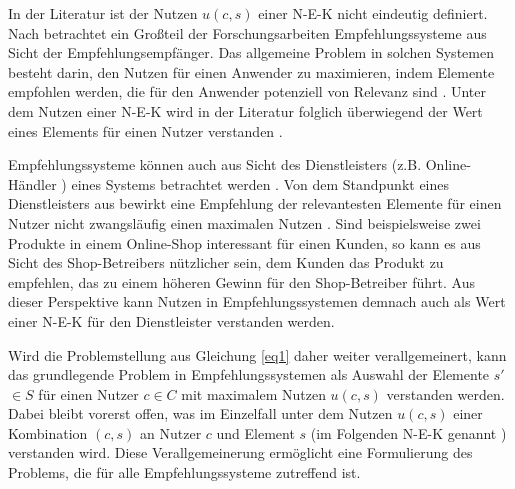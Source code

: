 In der Literatur ist der Nutzen $u(c,s)$ einer \ac{N-E-K} nicht eindeutig definiert.
Nach \textcite[S. 1]{jannach:article} betrachtet ein Großteil der Forschungsarbeiten Empfehlungssysteme aus Sicht der Empfehlungsempfänger.
Das allgemeine Problem in solchen Systemen besteht darin, den Nutzen für einen Anwender zu maximieren, indem Elemente empfohlen werden, die für den Anwender potenziell von Relevanz sind \cite[S. 1]{jannach:article}.
Unter dem Nutzen einer \ac{N-E-K} wird in der Literatur folglich überwiegend der Wert eines Elements für einen Nutzer verstanden \cite[S. 735]{adomavicius:inproceedings}\cite[S. 1]{klahold:book}\cite[S. 3880]{nilashi:article}\cite[S. 10f.]{ricci:inbook}.

Empfehlungssysteme können auch aus Sicht des Dienstleisters (z.B. Online-Händler \cite[S. 347]{abdollahpouri:inproceedings}\cite[S. 1]{jannach:article}\cite[S. 231]{sahoo:article}) eines Systems betrachtet werden \cite[S. 2]{jannach:2:inproceedings}.
Von dem Standpunkt eines Dienstleisters aus bewirkt eine Empfehlung der relevantesten Elemente für einen Nutzer nicht zwangsläufig einen maximalen Nutzen \cite[S. 1]{jannach:article}.
Sind beispielsweise zwei Produkte in einem Online-Shop interessant für einen Kunden, so kann es aus Sicht des Shop-Betreibers nützlicher sein, dem Kunden das Produkt zu empfehlen, das zu einem höheren Gewinn für den Shop-Betreiber führt.
Aus dieser Perspektive kann Nutzen in Empfehlungssystemen demnach auch als Wert einer \ac{N-E-K} für den Dienstleister verstanden werden.

Wird die Problemstellung aus Gleichung \ref{eq1} daher weiter verallgemeinert, kann das grundlegende Problem in Empfehlungssystemen als Auswahl der Elemente $s'$$\in$$S$ für einen Nutzer $c$$\in$$C$ mit maximalem Nutzen $u(c,s)$ verstanden werden.
Dabei bleibt vorerst offen, was im Einzelfall unter dem Nutzen $u(c,s)$ einer Kombination $(c,s)$ an Nutzer $c$ und Element $s$ (im Folgenden \ac{N-E-K} genannt \cite[S. 3]{recommenderSystems:2016}) verstanden wird.
Diese Verallgemeinerung ermöglicht eine Formulierung des Problems, die für alle Empfehlungssysteme zutreffend ist.

